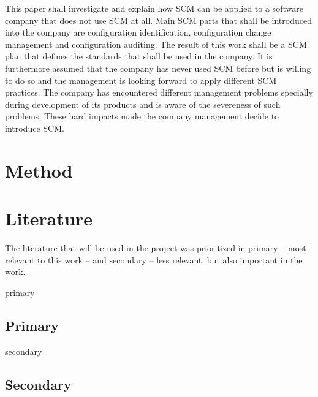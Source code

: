 \documentclass[a4paper]{article}
\begin{document}
This paper shall investigate and explain how SCM can be applied to a software company that does not use SCM at all. Main SCM parts that shall be introduced into the company are configuration identification, configuration change management and configuration auditing. The result of this work shall be a SCM plan that defines the standards that shall be used in the company. It is furthermore assumed that the company has never used SCM before but is willing to do so and the management is looking forward to apply different SCM practices. The company has encountered different management problems specially during development of its products and is aware of the severeness of such problems. These hard impacts made the company management decide to introduce SCM.

\section{Method}


\newpage
\appendix
\section{Literature}

The literature that will be used in the project was prioritized in primary -- most relevant to this work -- and secondary -- less relevant, but also important in the work. 
\begin{btSect}[alpha]{primary}
\subsection{Primary}
\btPrintAll
\end{btSect}

\begin{btSect}[alpha]{secondary}
\subsection{Secondary}
\btPrintAll
\end{btSect}
\end{document}
